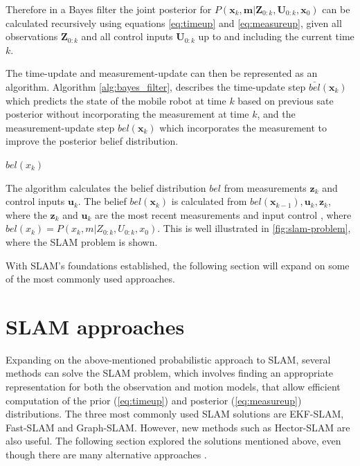 Therefore in a Bayes filter the joint posterior for $P(\mathbf{x}_k,\mathbf{m}|\mathbf{Z}_{0:k}, \mathbf{U}_{0:k}, \mathbf{x}_0)$ can be calculated recursively using equations \ref{eq:timeup} and \ref{eq:measureup}, given all observations $\mathbf{Z}_{0:k}$ and all control inputs $\mathbf{U}_{0:k}$ up to and including the current time $k$. 

The time-update and measurement-update can then be represented as an algorithm. Algorithm \ref{alg:bayes_filter}, describes the time-update step $\bar{bel}(\mathbf{x}_k)$ which predicts the state of the mobile robot at time $k$ based on previous sate posterior without incorporating the measurement at time $k$, and the measurement-update step $bel(\mathbf{x}_k)$ which incorporates the measurement to improve the posterior belief distribution.

\begin{algorithm}[H]
	\SetAlgoLined
	
	\Return $bel(x_k)$
	\caption[Bayes Filter]{The algorithm calculates the belief distribution $bel$ from measurements $\mathbf{z}_k$ and control inputs $\mathbf{u}_k$. The belief $bel(\mathbf{x}_k)$ is calculated from $bel(\mathbf{x}_{k-1}), \mathbf{u}_k, \mathbf{z}_k$, where the $\mathbf{z}_k$ and $\mathbf{u}_k$ are the most recent measurements and input control \cite{Thrun2006}, where $bel(x_k) = P(x_k,m|Z_{0:k}, U_{0:k},x_0)$. This is well illustrated in \ref{fig:slam-problem}, where the SLAM problem is shown.}\label{alg:bayes_filter}
\end{algorithm}

With SLAM's foundations established, the following section will expand on some of the most commonly used approaches.

\section{SLAM approaches}
Expanding on the above-mentioned probabilistic approach to SLAM, several methods can solve the SLAM problem, which involves finding an appropriate representation for both the observation and motion models, that allow efficient computation of the prior (\ref{eq:timeup}) and posterior (\ref{eq:measureup}) distributions. The three most commonly used SLAM solutions are EKF-SLAM, Fast-SLAM and Graph-SLAM. However, new methods such as Hector-SLAM are also useful. The following section explored the solutions mentioned above, even though there are many alternative approaches \cite{Seminar2016}.

